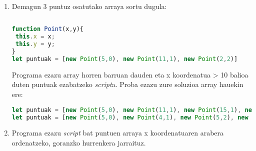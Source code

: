  \begin{enumerate}
     \item Demagun 3 puntuz osatutako arraya sortu dugula:
     \begin{lstlisting}[language=JavaScript]
     
function Point(x,y){
 this.x = x;
 this.y = y;
}
let puntuak = [new Point(5,0), new Point(11,1), new Point(2,2)]

\end{lstlisting}

Programa ezazu array horren barruan dauden eta x koordenatua > 10 balioa duten
puntuak ezabatzeko \textit{script}a. Proba ezazu zure soluzioa array hauekin ere:

\begin{lstlisting}[language=JavaScript]
let puntuak = [new Point(5,0), new Point(11,1), new Point(15,1), new Point(2,2)];
let puntuak = [new Point(5,0), new Point(4,1), new Point(5,2), new Point(6,0), new Point(11,1), new Point(15,2)];
\end{lstlisting}

\item Programa ezazu \textit{script} bat puntuen arraya x koordenatuaren arabera ordenatzeko, goranzko hurrenkera jarraituz.
\end{enumerate}